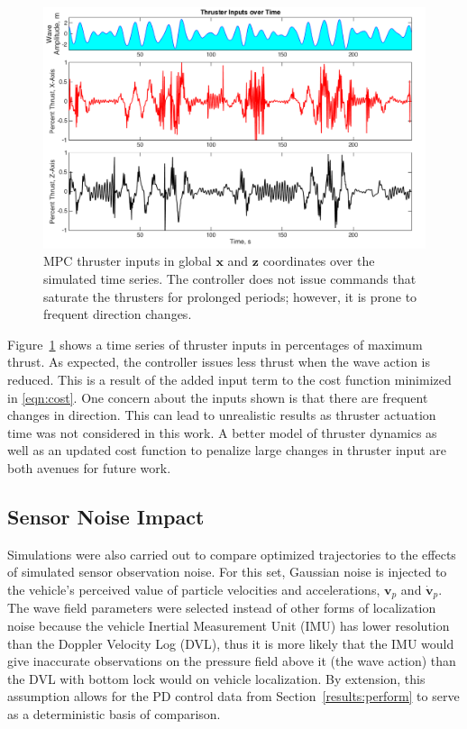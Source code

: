 \documentclass[letterpaper, 10 pt, conferences]{IEEEconf}  %
\renewcommand{\vec}[1]{\mathbf{#1}}
\begin{document}
\begin{figure}
\includegraphics[width=1\columnwidth]{images/thrusts}
\centering
\caption{MPC thruster inputs in global $\vec{x}$ and $\vec{z}$ coordinates over the simulated time series. The controller does not issue commands that saturate the thrusters for prolonged periods; however, it is prone to frequent direction changes.}
\label{fig:thrusts}
\end{figure}

Figure~\ref{fig:thrusts} shows a time series of thruster inputs in percentages of maximum thrust. As expected, the controller issues less thrust when the wave action is reduced. This is a result of the added input term to the cost function minimized in \eqref{eqn:cost}. One concern about the inputs shown is that there are frequent changes in direction. This can lead to unrealistic results as thruster actuation time was not considered in this work. A better model of thruster dynamics as well as an updated cost function to penalize large changes in thruster input are both avenues for future work.

\subsection{Sensor Noise Impact} \label{results:noise}

Simulations were also carried out to compare optimized trajectories to the effects of simulated sensor observation noise. For this set, Gaussian noise is injected to the vehicle's perceived value of particle velocities and accelerations, $\vec{v}_p$ and $\dot{\vec{v}}_p$. The wave field parameters were selected instead of other forms of localization noise because the vehicle Inertial Measurement Unit (IMU) has lower resolution than the Doppler Velocity Log (DVL), thus it is more likely that the IMU would give inaccurate observations on the pressure field above it (the wave action) than the DVL with bottom lock would on vehicle localization. By extension, this assumption allows for the PD control data from Section~\ref{results:perform} to serve as a deterministic basis of comparison.
\end{document}
